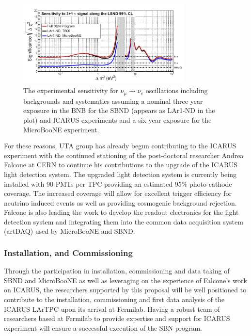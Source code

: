 \begin{figure}[htb]
\centering
\includegraphics[width=0.78\textwidth]{images/Sensitivity.png}
\caption[]{The experimental sensitivity for $\nu_{\mu} \rightarrow \nu_{e}$ oscillations including backgrounds and systematics assuming a nominal three year exposure in the BNB for the SBND (appears as LAr1-ND in the plot) and ICARUS experiments and a six year exposure for the MicroBooNE experiment.}
\label{fig:sense}
\end{figure}

For these reasons, UTA group has already begun contributing to the ICARUS experiment with the continued stationing of the post-doctoral researcher Andrea Falcone at CERN to continue his contributions to the upgrade of the ICARUS light detection system. The upgraded light detection system is currently being installed with 90-PMTs per TPC providing an estimated 95$\%$ photo-cathode coverage. The increased coverage will allow for excellent trigger efficiency for neutrino induced events as well as providing cosmogenic background rejection. Falcone is also leading the work to develop the readout electronics for the light detection system and integrating them into the common data acquisition system (artDAQ) used by MicroBooNE and SBND.

\subsubsection{Installation, and Commissioning}\label{sec:ICARUSBulid}
Through the participation in installation, commissioning and data taking of SBND and MicroBooNE as well as leveraging on the experience of Falcone's work on ICARUS, the researchers supported by this proposal will be well positioned to contribute to the installation, commissioning and first data analysis of the ICARUS LArTPC upon its arrival at Fermilab. Having a robust team of researchers based at Fermilab to provide expertise and support for ICARUS experiment will ensure a successful execution of the SBN program.

